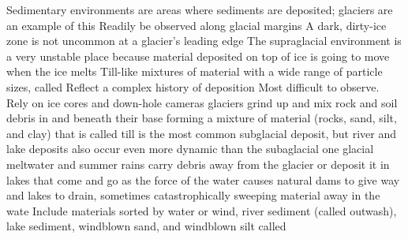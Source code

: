         \ddd Sedimentary environments are areas where sediments are deposited; glaciers are an example of this
            \ddd Readily be observed along glacial margins
            \ddd A dark, dirty-ice zone is not uncommon at a glacier’s leading edge
            \ddd The supraglacial environment is a very unstable place because material deposited on top of ice is going to move when the ice melts
            \ddd Till-like mixtures of material with a wide range of particle sizes, called 
            \ddd Reflect a complex history of deposition
            \ddd Most difficult to observe. Rely on ice cores and down-hole cameras 
            \ddd glaciers grind up and mix rock and soil debris in and beneath their base forming a mixture of material (rocks, sand, silt, and clay) that is called till
            \ddd {} is the most common subglacial deposit, but river and lake deposits also occur 
            \ddd even more dynamic than the subaglacial one
            \ddd glacial meltwater and summer rains carry debris away from the glacier or deposit it in lakes that come and go as the force of the water causes natural dams to give way and lakes to drain, sometimes catastrophically sweeping material away in the wate
            \ddd Include materials sorted by water or wind, river sediment (called outwash), lake sediment, windblown sand, and windblown silt called  \ddd